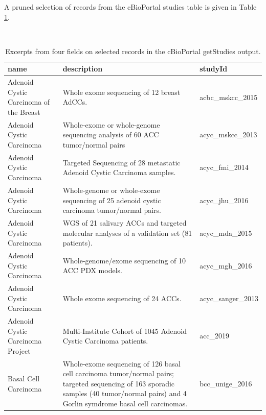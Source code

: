 \documentclass[graybox]{svmult}
\begin{document}
A pruned selection of records from the cBioPortal
studies table is given in Table \ref{tab:tab-cball}.

\begin{table}
\caption{\label{tab:tab-cball}Excerpts from four fields on selected records in the cBioPortal getStudies output.}\\
\begin{tabular}{p{5cm}p{5cm}l}
name & description & studyId \\ \hline
Adenoid Cystic Carcinoma of the Breast & Whole exome sequencing of 12 breast AdCCs. & acbc\_mskcc\_2015 \\
Adenoid Cystic Carcinoma & Whole-exome or whole-genome sequencing analysis of 60 ACC tumor/normal pairs & acyc\_mskcc\_2013 \\
Adenoid Cystic Carcinoma & Targeted Sequencing of 28 metastatic Adenoid Cystic Carcinoma samples. & acyc\_fmi\_2014 \\
Adenoid Cystic Carcinoma & Whole-genome or whole-exome sequencing of 25 adenoid cystic carcinoma tumor/normal pairs. & acyc\_jhu\_2016 \\
Adenoid Cystic Carcinoma & WGS of 21 salivary ACCs and targeted molecular analyses of a validation set (81 patients). & acyc\_mda\_2015 \\
Adenoid Cystic Carcinoma & Whole-genome/exome sequencing of 10 ACC PDX models. & acyc\_mgh\_2016 \\
Adenoid Cystic Carcinoma & Whole exome sequencing of 24 ACCs. & acyc\_sanger\_2013 \\
Adenoid Cystic Carcinoma Project & Multi-Institute Cohort of 1045 Adenoid Cystic Carcinoma patients. & acc\_2019 \\
Basal Cell Carcinoma & Whole-exome sequencing of 126 basal cell carcinoma tumor/normal pairs; targeted sequencing of 163 sporadic samples (40 tumor/normal pairs) and 4 Gorlin symdrome basal cell carcinomas. & bcc\_unige\_2016 \\
\end{tabular}
\end{table}
\end{document}
